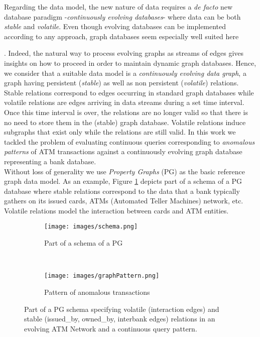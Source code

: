 \noindent
Regarding the data model, the new nature of data requires a \emph{de facto} 
new database paradigm -\emph{continuously evolving  databases}- 
where data can be both \emph{stable} and \emph{volatile}. 
Even though evolving databases can be implemented according to any approach, 
graph databases seem especially well suited here {\cite{GDB-angles2008survey, GDB-kumar2015graph}. 
Indeed, the natural way to process evolving graphs as streams of edges gives insights 
on how to proceed in order to maintain dynamic graph databases.  
Hence, we consider that a suitable data model is a \emph{continuously evolving data graph}, 
a graph having persistent (\emph{stable}) as well as non persistent (\emph{volatile}) relations. 
Stable relations correspond to edges occurring in standard graph databases while volatile relations 
are edges arriving in data streams during a set time interval. 
Once this time interval is over, the relations are no longer valid so that there is no need to store 
them in the (stable) graph database. 
Volatile relations induce subgraphs that exist only while the relations are still valid. 
%
\noindent
In this work we tackled the problem of evaluating continuous queries corresponding to 
\emph{anomalous patterns} of ATM transactions against a continuously evolving graph database  
representing a bank database.\\

Without loss of generality we use  \emph{Property Graphs} (PG) 
\cite{PG-angles2017foundations, angles2018propertyGraphDatabaseModel} 
as the basic reference graph data model. 
As an example, Figure \ref{fig:constinuousPGa} depicts part of a schema of a 
PG database where stable relations correspond to the data that a bank 
typically gathers on its issued cards, ATMs (Automated Teller Machines) network, etc. 
Volatile relations model the interaction between cards and ATM entities.\\
%
\begin{figure*}[h]
    \centering
    \begin{subfigure}[b]{0.6\textwidth}
        \centering
        \texttt{[image: images/schema.png]}
        \caption{Part of a schema of a PG}
         \label{fig:constinuousPGa}
    \end{subfigure}%
     ~ 
    \begin{subfigure}[b]{0.4\textwidth}
        \centering
        \texttt{[image: images/graphPattern.png]}
        \caption{Pattern of anomalous transactions}
        \label{fig:constinuousPGb}
    \end{subfigure}
    \caption{Part of a PG schema specifying volatile (\textsf{interaction} edges) and stable  (\textsf{issued\_by, owned\_by, interbank} edges) relations in an evolving ATM Network and a continuous query pattern.}
    \label{fig:constinuousPG}
\end{figure*}
%

}
